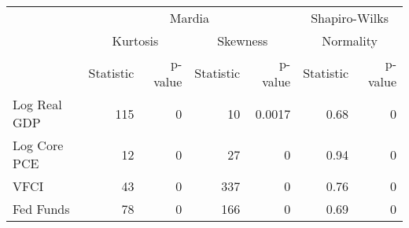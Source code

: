 \begingroup
\fontsize{12.0pt}{14.4pt}\selectfont
\begin{tabular}{l|rrrrrr}
\toprule
 & \multicolumn{4}{c}{Mardia} & \multicolumn{2}{c}{Shapiro-Wilks} \\ 
\cmidrule(lr){2-5} \cmidrule(lr){6-7}
 & \multicolumn{2}{c}{Kurtosis} & \multicolumn{2}{c}{Skewness} & \multicolumn{2}{c}{Normality} \\ 
\cmidrule(lr){2-3} \cmidrule(lr){4-5} \cmidrule(lr){6-7}
 & Statistic & p-value & Statistic & p-value & Statistic & p-value \\ 
\midrule\addlinespace[2.5pt]
Log Real GDP & 115 & 0 & 10 & 0.0017 & 0.68 & 0 \\ 
Log Core PCE & 12 & 0 & 27 & 0 & 0.94 & 0 \\ 
VFCI & 43 & 0 & 337 & 0 & 0.76 & 0 \\ 
Fed Funds & 78 & 0 & 166 & 0 & 0.69 & 0 \\ 
\bottomrule
\end{tabular}
\endgroup

